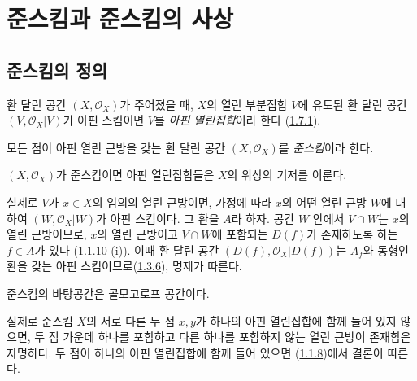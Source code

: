 \section{준스킴과 준스킴의 사상}
\label{section:I.2-ko}

\subsection{준스킴의 정의}
\label{subsection:I.2.1-ko}

\begin{env}[2.1.1]
\label{I.2.1.1-ko}
환 달린 공간 $(X,\mathscr{O}_X)$가 주어졌을 때, $X$의 열린 부분집합
$V$에 유도된 환 달린 공간 $(V,\mathscr{O}_X|V)$가 아핀 스킴이면
$V$를 \emph{아핀 열린집합}이라 한다
(\hyperref[I.1.7.1-ko]{1.7.1}).
\end{env}

\begin{definition}[2.1.2]
\label{I.2.1.2-ko}
모든 점이 아핀 열린 근방을 갖는 환 달린 공간 $(X,\mathscr{O}_X)$를
\emph{준스킴}이라 한다.
\end{definition}


\begin{proposition}[2.1.3]
\label{I.2.1.3-ko}
$(X,\mathscr{O}_X)$가 준스킴이면 아핀 열린집합들은 $X$의 위상의
기저를 이룬다.
\end{proposition}

실제로 $V$가 $x\in X$의 임의의 열린 근방이면, 가정에 따라 $x$의
어떤 열린 근방 $W$에 대하여 $(W,\mathscr{O}_X|W)$가 아핀 스킴이다.
그 환을 $A$라 하자. 공간 $W$ 안에서 $V\cap W$는 $x$의 열린
근방이므로, $x$의 열린 근방이고 $V\cap W$에 포함되는 $D(f)$가
존재하도록 하는 $f\in A$가 있다
(\hyperref[I.1.1.10-ko]{1.1.10 (i)}). 이때 환 달린 공간
$(D(f),\mathscr{O}_X|D(f))$는 $A_f$와 동형인 환을 갖는 아핀
스킴이므로(\hyperref[I.1.3.6-ko]{1.3.6}), 명제가 따른다.

\begin{proposition}[2.1.4]
\label{I.2.1.4-ko}
준스킴의 바탕공간은 콜모고로프 공간이다.
\end{proposition}

실제로 준스킴 $X$의 서로 다른 두 점 $x,y$가 하나의 아핀
열린집합에 함께 들어 있지 않으면, 두 점 가운데 하나를 포함하고
다른 하나를 포함하지 않는 열린 근방이 존재함은 자명하다. 두 점이
하나의 아핀 열린집합에 함께 들어 있으면
(\hyperref[I.1.1.8-ko]{1.1.8})에서 결론이 따른다.

